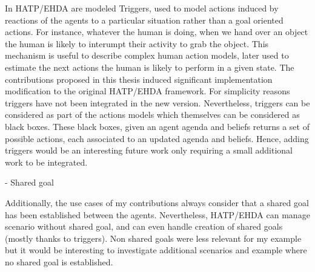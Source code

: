 In HATP/EHDA are modeled Triggers, used to model actions induced by reactions of the agents to a particular situation rather than a goal oriented actions. For instance, whatever the human is doing, when we hand over an object the human is likely to interumpt their activity to grab the object. This mechanism is useful to describe complex human action models, later used to estimate the next actions the human is likely to perform in a given state. 
The contributions proposed in this thesis induced significant implementation modification to the original HATP/EHDA framework. For simplicity reasons triggers have not been integrated in the new version. Nevertheless, triggers can be considered as part of the actions models which themselves can be considered as black boxes. These black boxes, given an agent agenda and beliefs returns a set of possible actions, each associated to an updated agenda and beliefs. Hence, adding triggers would be an interesting future work only requiring a small additional work to be integrated.

- Shared goal 

Additionally, the use cases of my contributions always consider that a shared goal has been established between the agents. Nevertheless, HATP/EHDA can manage scenario without shared goal, and can even handle creation of shared goals (mostly thanks to triggers). Non shared goals were less relevant for my example but it would be interesting to investigate additional scenarios and example where no shared goal is established.
